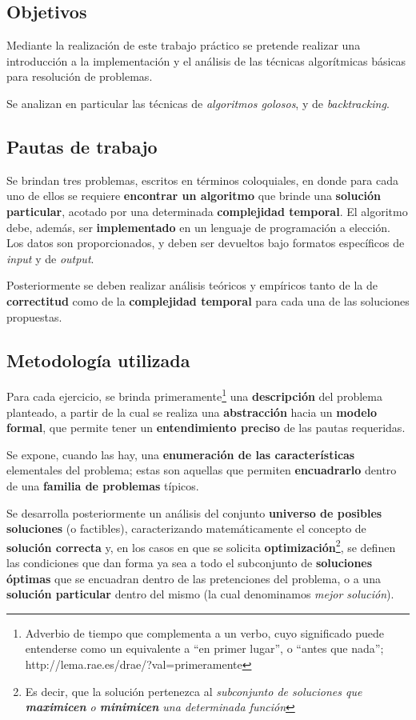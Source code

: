 \documentclass[11pt, a4paper, twoside]{article}
\begin{document}
{}

\subsection{Objetivos}
Mediante la realización de este trabajo práctico se pretende realizar una introducción a la implementación y el análisis de las técnicas algorítmicas básicas para resolución de problemas. 

Se analizan en particular las técnicas de \textit{algoritmos golosos}, y de \textit{backtracking}.

\subsection{Pautas de trabajo}
Se brindan tres problemas, escritos en términos coloquiales, en donde para cada uno de ellos se requiere \textbf{encontrar un algoritmo} que brinde una \textbf{solución particular}, acotado por una determinada \textbf{complejidad temporal}. El algoritmo debe, además, ser \textbf{implementado} en un lenguaje de programación a elección. Los datos son proporcionados, y deben ser devueltos bajo formatos específicos de \textit{input} y de \textit{output}.

Posteriormente se deben realizar análisis teóricos y empíricos tanto de la de \textbf{correctitud} como de la \textbf{complejidad temporal} para cada una de las soluciones propuestas.

\subsection{Metodología utilizada}
Para cada ejercicio, se brinda primeramente\footnote{Adverbio de tiempo que complementa a un verbo, cuyo significado puede entenderse como un equivalente a ``en primer lugar'', o ``antes que nada''; http://lema.rae.es/drae/?val=primeramente} una \textbf{descripción} del problema planteado, a partir de la cual se realiza una \textbf{abstracción} hacia un \textbf{modelo formal}, que permite tener un \textbf{entendimiento preciso} de las pautas requeridas. 

Se expone, cuando las hay, una \textbf{enumeración de las características} elementales del problema; estas son aquellas que permiten \textbf{encuadrarlo} dentro de una \textbf{familia de problemas} típicos.

Se desarrolla posteriormente un análisis del conjunto \textbf{universo de posibles soluciones} (o factibles), caracterizando matemáticamente el concepto de \textbf{solución correcta} y, en los casos en que se solicita \textbf{optimización}\footnote{Es decir, que la solución pertenezca al \textit{subconjunto de soluciones que \textbf{maximicen} o \textbf{minimicen} una determinada función}}, se definen las condiciones que dan forma ya sea a todo el subconjunto de \textbf{soluciones óptimas} que se encuadran dentro de las pretenciones del problema, o a una \textbf{solución particular} dentro del mismo (la cual denominamos \textit{mejor solución}).
\end{document}
